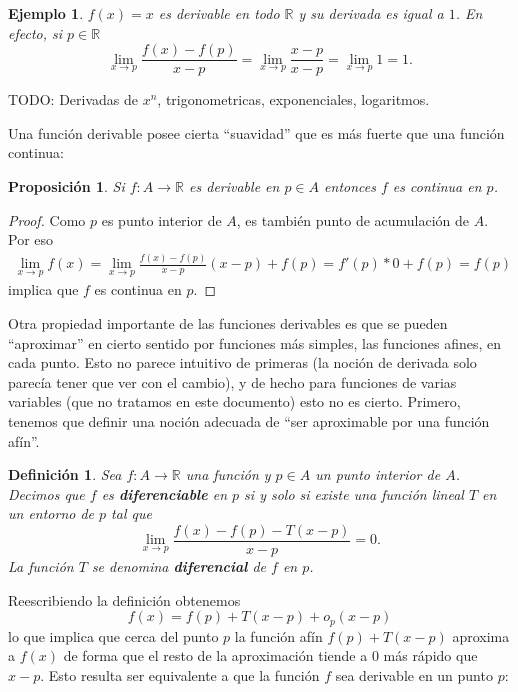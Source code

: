 \documentclass{article}
\newtheorem{prop}{Proposición}
\newtheorem{define}{Definición}
\newtheorem{ejem}{Ejemplo}
\newcommand{\reales}{\mathbb{R}}
\begin{document}
\begin{ejem}
	$f(x) = x$ es derivable en todo $\reales$ y su derivada es igual a $1$. En efecto, si $p \in \reales$
	\begin{equation*}
		\lim_{x \rightarrow p} \frac{f(x) - f(p)}{x - p} = \lim_{x \rightarrow p} \frac{x - p}{x - p} = \lim_{x \rightarrow p} 1 = 1.
	\end{equation*}
\end{ejem}
TODO: Derivadas de $x^n$, trigonometricas, exponenciales, logaritmos. 

Una función derivable posee cierta ``suavidad'' que es más fuerte que una función continua:

\begin{prop}
	Si $f: A \rightarrow \reales$ es derivable en $p \in A$ entonces $f$ es continua en $p$.
\end{prop}

\begin{proof}
	Como $p$ es punto interior de $A$, es también punto de acumulación de $A$. Por eso
	\begin{align*}
		\lim_{x\rightarrow p} f(x) = \lim_{x\rightarrow p} \frac{f(x) - f(p)}{x - p} (x-p) + f(p) = f'(p)*0 + f(p) = f(p)
	\end{align*}
	implica que $f$ es continua en $p$.
\end{proof}

Otra propiedad importante de las funciones derivables es que se pueden ``aproximar'' en cierto sentido por funciones más simples, las funciones afines, en cada punto. Esto no parece intuitivo de primeras (la noción de derivada solo parecía tener que ver con el cambio), y de hecho para funciones de varias variables (que no tratamos en este documento) esto no es cierto. Primero, tenemos que definir una noción adecuada de ``ser aproximable por una función afín''.

\begin{define}
	Sea $f: A \rightarrow \reales$ una función y $p \in A$ un punto interior de $A$. Decimos que $f$ es \textbf{diferenciable} en $p$ si y solo si existe una función lineal $T$ en un entorno de $p$ tal que
	\begin{equation*}
		\lim_{x \rightarrow p} \frac{f(x) - f(p) - T(x-p)}{x-p} = 0.
	\end{equation*}
	La función $T$ se denomina \textbf{diferencial} de $f$ en $p$.
\end{define}

Reescribiendo la definición obtenemos
\begin{equation*}
	f(x) = f(p) + T(x-p) + o_p(x-p)
\end{equation*}
lo que implica que cerca del punto $p$ la función afín $f(p) + T(x-p)$ aproxima a $f(x)$ de forma que el resto de la aproximación tiende a $0$ más rápido que $x-p$. Esto resulta ser equivalente a que la función $f$ sea derivable en un punto $p$:
\end{document}
